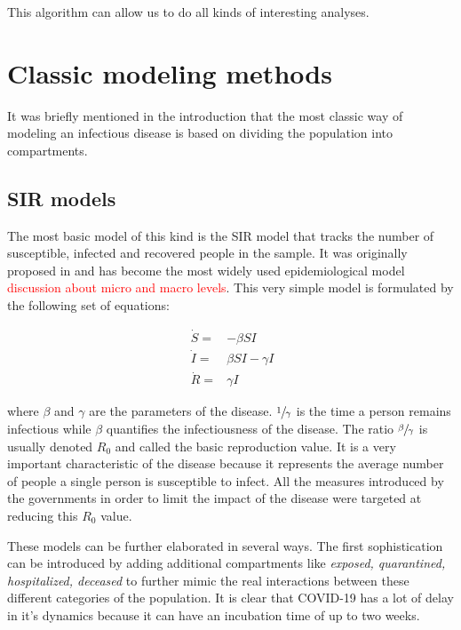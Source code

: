 \documentclass[12pt, letterpaper]{article}
\newcommand{\com}[1]{{\small {\fontfamily{ptm} \selectfont \textcolor{red}{#1}}}}
\begin{document}
This algorithm can allow us to do all kinds of interesting analyses. 

\section{Classic modeling methods}\label{sec:class}

It was briefly mentioned in the introduction that the most classic way of modeling an infectious disease is based on dividing the population into compartments. 

\subsection{SIR models}

The most basic model of this kind is the SIR model that tracks the number of susceptible, infected and recovered people in the sample. 
It was originally proposed in \cite{sir} and has become the most widely used epidemiological model \com{discussion about micro and macro levels}. 
This very simple model is formulated by the following set of equations:

\begin{equation}\label{eq:sir}\
\begin{split}
\dot{S} = &- \beta SI \\
\dot{I} = &\beta SI - \gamma I \\
\dot{R} = & \gamma I
\end{split}
\end{equation}

where $\beta$ and $\gamma$ are the parameters of the disease. 
$\sfrac{1}{\gamma}$ is the time a person remains infectious while $\beta$ quantifies the infectiousness of the disease. 
The ratio $\sfrac{\beta}{\gamma}$ is usually denoted $R_0$ and called the basic reproduction value. 
It is a very important characteristic of the disease because it represents the average number of people a single person is susceptible to infect. 
All the measures introduced by the governments in order to limit the impact of the disease were targeted at reducing this $R_0$ value. 

These models can be further elaborated in several ways. 
The first sophistication can be introduced by adding additional compartments like {\em exposed, quarantined, hospitalized, deceased} to further mimic the real interactions between these different categories of the population. 
It is clear that COVID-19 has a lot of delay in it's dynamics \cite{delay} because it can have an incubation time of up to two weeks. 
\end{document}
